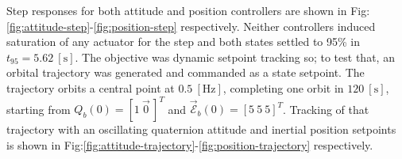 \documentclass[a4paper, 10pt, conference]{ieeeconf}
\begin{document}
\par
Step responses for both attitude and position controllers are shown in Fig:\ref{fig:attitude-step}-\ref{fig:position-step} respectively. Neither controllers induced saturation of any actuator for the step and both states settled to 95\% in $t_{95}=5.62~[\text{s}]$. The objective was dynamic setpoint tracking so; to test that, an orbital trajectory was generated and commanded as a state setpoint. The trajectory orbits a central point at $0.5~[\text{Hz}]$, completing one orbit in $120~[\text{s}]$, starting from $Q_b(0)=[1~\vec{0}\hspace{2pt}]^T$ and $\vec{\mathcal{E}}_b(0)=[5~5~5]^T$. Tracking of that trajectory with an oscillating quaternion attitude and inertial position setpoints is shown in Fig:\ref{fig:attitude-trajectory}-\ref{fig:position-trajectory} respectively.
\end{document}
